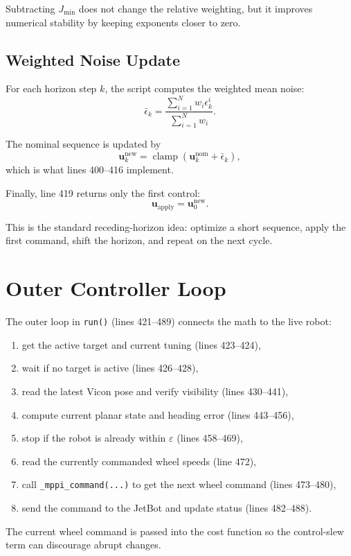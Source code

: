 \documentclass[11pt]{article}
\begin{document}
Subtracting $J_{\min}$ does not change the relative weighting, but it improves
numerical stability by keeping exponents closer to zero.

\subsection{Weighted Noise Update}

For each horizon step $k$, the script computes the weighted mean noise:
\[
\bar{\epsilon}_k =
\frac{\sum_{i=1}^N w_i \epsilon^i_k}{\sum_{i=1}^N w_i}.
\]

The nominal sequence is updated by
\[
\mathbf{u}^{\mathrm{new}}_k
=
\operatorname{clamp}\!\left(\mathbf{u}^{\mathrm{nom}}_k + \bar{\epsilon}_k\right),
\]
which is what lines 400--416 implement.

Finally, line 419 returns only the first control:
\[
\mathbf{u}_{\mathrm{apply}} = \mathbf{u}^{\mathrm{new}}_0.
\]

This is the standard receding-horizon idea: optimize a short sequence, apply
the first command, shift the horizon, and repeat on the next cycle.

\section{Outer Controller Loop}

The outer loop in \texttt{run()} (lines 421--489) connects the math to the
live robot:
\begin{enumerate}
\item get the active target and current tuning (lines 423--424),
\item wait if no target is active (lines 426--428),
\item read the latest Vicon pose and verify visibility (lines 430--441),
\item compute current planar state and heading error (lines 443--456),
\item stop if the robot is already within $\varepsilon$ (lines 458--469),
\item read the currently commanded wheel speeds (line 472),
\item call \texttt{\_mppi\_command(...)} to get the next wheel command
      (lines 473--480),
\item send the command to the JetBot and update status (lines 482--488).
\end{enumerate}

The current wheel command is passed into the cost function so the
control-slew term can discourage abrupt changes.
\end{document}
